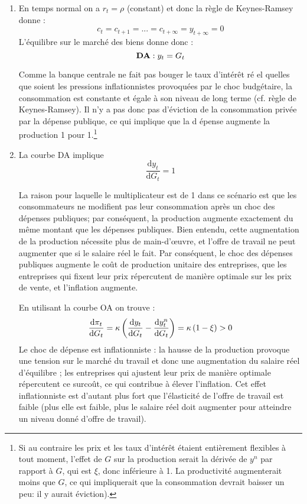 \documentclass[a4paper,11pt]{article}
\begin{document}
\begin{enumerate}
\item En temps normal on a $r_{t}=\rho $ (constant) et donc la r\`{e}gle de
Keynes-Ramsey donne :%
\begin{equation*}
c_{t}=c_{t+1}=...=c_{t+\infty }=y_{t+\infty }=0
\end{equation*}%
L'\'{e}quilibre sur le march\'{e} des biens donne donc :%
\begin{equation*}
\text{\textbf{DA}}:y_{t}=G_{t}
\end{equation*}%


Comme la banque centrale ne fait pas bouger le taux d'int\'{e}r\^{e}t r\'{e}%
el quelles que soient les pressions inflationnistes provoqu\'{e}es par le
choc budg\'{e}taire, la consommation est constante et \'{e}gale \`{a} son
niveau de long terme (cf. r\`{e}gle de
Keynes-Ramsey). Il n'y a pas donc pas d'\'{e}viction de la
consommation priv\'{e}e par la d\'{e}pense publique, ce qui implique que la d%
\'{e}pense augmente la production 1 pour 1.\footnote{Si au contraire les prix
et les taux d'intérêt étaient entièrement flexibles à tout moment, l'effet de $G$
sur la production serait la dérivée de $y^n$ par rapport à $G$, qui est $\xi$, donc inférieure à 1.
La productivité augmenterait moins que $G$, ce qui impliquerait que la consommation devrait baisser un peu: il y aurait éviction).}

\item La courbe DA implique 
\begin{equation*}
\frac{\text{d}y_{t}}{\text{d}G_{t}}=1
\end{equation*}%

La raison pour laquelle le multiplicateur est de 1 dans ce scénario est que les consommateurs
ne modifient pas leur consommation après un choc des dépenses publiques; par conséquent, la
production augmente exactement du même montant que les dépenses publiques. Bien entendu,
cette augmentation de la production nécessite plus de main-d’œuvre, et l’offre de travail ne peut
augmenter que si le salaire réel le fait. Par conséquent, le choc des dépenses publiques augmente le
coût de production unitaire des entreprises, que les entreprises qui fixent leur prix répercutent de
manière optimale sur les prix de vente, et l’inflation augmente.


En utilisant la courbe OA on trouve : 
\begin{equation*}
\frac{\text{d}\pi _{t}}{\text{d}G_{t}}=\kappa \left( \frac{\text{d}y_{t}}{%
\text{d}G_{t}}-\frac{\text{d}y_{t}^{n}}{\text{d}G_{t}}\right) =\kappa \left(
1-\xi \right) >0
\end{equation*}%
Le choc de d\'{e}pense est inflationniste : la hausse de la production
provoque une tension sur le march\'{e} du travail et donc une augmentation
du salaire r\'{e}el d'\'{e}quilibre ; les entreprises qui ajustent leur prix
de mani\`{e}re optimale r\'{e}percutent ce surco\^{u}t, ce qui contribue 
\`{a} \'{e}lever l'inflation. Cet effet inflationniste est d'autant plus
fort que l'\'{e}lasticit\'{e} de l'offre de travail est faible (plus elle
est faible, plus le salaire r\'{e}el doit augmenter pour atteindre un niveau
donn\'{e} d'offre de travail).


\end{enumerate}
\end{document}
